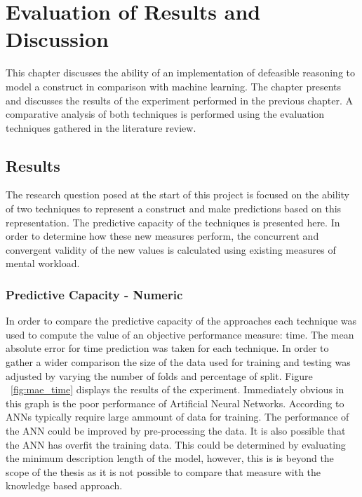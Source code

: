 
\chapter{Evaluation of Results and Discussion} %

\label{Chapter5} %


This chapter discusses the ability of an implementation of defeasible reasoning to model a construct in comparison with machine learning. The chapter presents and discusses the results of the experiment performed in the previous chapter. A comparative analysis of both techniques is performed using the evaluation techniques gathered in the literature review.

\section{Results}

The research question posed at the start of this project is focused on the ability of two techniques to represent a construct and make predictions based on this representation. The predictive capacity of the techniques is presented here. In order to determine how these new measures perform, the concurrent and convergent validity of the new values is calculated using existing measures of mental workload. 

\subsection{Predictive Capacity - Numeric}

In order to compare the predictive capacity of the approaches each technique was used to compute the value of an objective performance measure: time. The mean absolute error for time prediction was taken for each technique. In order to gather a wider comparison the size of the data used for training and testing was adjusted by varying the number of folds and percentage of split. Figure ~\ref{fig:mae_time} displays the results of the experiment. Immediately obvious in this graph is the poor performance of Artificial Neural Networks. According to \cite{silvert2000can} ANNs typically require large ammount of data for training. The performance of the ANN could be improved by pre-processing the data. It is also possible that the ANN has overfit the training data. This could be determined by evaluating the minimum description length of the model, however, this is is beyond the scope of the thesis as it is not possible to compare that measure with the knowledge based approach.

